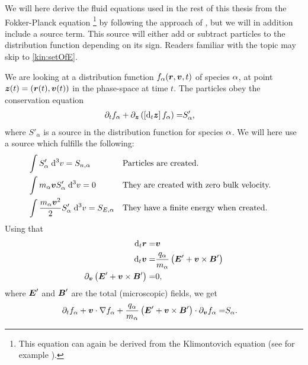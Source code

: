 We will here derive the fluid equations used in the rest of this thesis from the Fokker-Planck equation %
\footnote{
    This equation can again be derived from the Klimontovich equation (see for example \cite{Klimontovich1983book}).
}
%
by following the approach of \cite{Helander2002book}, but we will in addition include a source term.
This source will either add or subtract particles to the distribution function depending on its sign.
Readers familiar with the topic may skip to \cref{kin:setOfE}.

We are looking at a distribution function $f_\alpha(\boldsymbol{r},\boldsymbol{v},t)$ of species $\alpha$, at point $\boldsymbol{z}(t)=(\boldsymbol{r}(t),\boldsymbol{v}(t))$ in the phase-space at time $t$.
The particles obey the conservation equation
%
\begin{align*}
    \partial_t f_\alpha + \partial_{\boldsymbol{z}} \left(\left[\text{d}_t \boldsymbol{z}\right]f_\alpha\right) =& S'_\alpha,
\end{align*}
%
where $S'_\alpha$ is a source in the distribution function for species $\alpha$.
We will here use a source which fulfills the following:
%
\begin{align*}
    &\int {S'_{\alpha}} \; \text{d} {^3v} = S_{n,\alpha}&
    &\text{Particles are created.}&
    \\
    &\int {m_\alpha\boldsymbol{v} S'_\alpha} \; \text{d} {^3v} = 0&
    &\text{They are created with zero bulk velocity.}&
    \\
    &\int {\frac{m_\alpha\boldsymbol{v}^2}{2} S'_\alpha} \; \text{d} {^3v} = S_{E,\alpha}&
    &\text{They have a finite energy when created.}&
\end{align*}
%
Using that
%
\begin{align*}
    \text{d}_t \boldsymbol{r}     =& \boldsymbol{v}\\
    \text{d}_t \boldsymbol{v}     =& \frac{q_\alpha}{m_\alpha}\left(\boldsymbol{E}'+\boldsymbol{v}\times\boldsymbol{B}'\right)\\
    \partial_{\boldsymbol{v}} \left(\boldsymbol{E}'+\boldsymbol{v}\times\boldsymbol{B}'\right) =& 0,
\end{align*}
%
where $\boldsymbol{E}'$ and $\boldsymbol{B}'$ are the total (microscopic) fields, we get
%
\begin{align*}
      \partial_t f_\alpha
    + \boldsymbol{v}\cdot\nabla f_\alpha
    + \frac{q_\alpha}{m_\alpha}
      \left(\boldsymbol{E}'+\boldsymbol{v}\times\boldsymbol{B}'\right)\cdot\partial_{\boldsymbol{v}}f_\alpha
    =& S_\alpha.
\end{align*}


